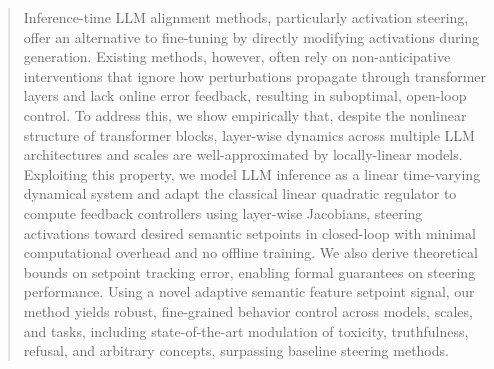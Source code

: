\documentclass{article}
\theoremstyle{plain}
\theoremstyle{definition}
\theoremstyle{remark}
\begin{document}

\printAffiliationsAndNotice{}  

\begin{abstract}

    Inference-time LLM alignment methods, particularly activation steering, offer an alternative to fine-tuning by directly modifying activations during generation. Existing methods, however, often rely on non-anticipative interventions that ignore how perturbations propagate through transformer layers and lack online error feedback, resulting in suboptimal, open-loop control. To address this, we show empirically that, despite the nonlinear structure of transformer blocks, layer-wise dynamics across multiple LLM architectures and scales are well-approximated by locally-linear models. Exploiting this property, we model LLM inference as a linear time-varying dynamical system and adapt the classical linear quadratic regulator to compute feedback controllers using layer-wise Jacobians, steering activations toward desired semantic setpoints in closed-loop with minimal computational overhead and no offline training. We also derive theoretical bounds on setpoint tracking error, enabling formal guarantees on steering performance. Using a novel adaptive semantic feature setpoint signal, our method yields robust, fine-grained behavior control across models, scales, and tasks, including state-of-the-art modulation of toxicity, truthfulness, refusal, and arbitrary concepts, surpassing baseline steering methods.
    

\vspace{-15pt}    
\end{abstract}
\end{document}
